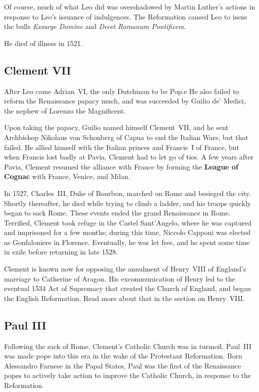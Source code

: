 Of course, much of what Leo did was overshadowed by Martin Luther's actions
in response to Leo's issuance of indulgences.
The Reformation caused Leo to issue the bulls \textit{Exsurge Domine} and \textit{Decet Romanum Pontificem}.

He died of illness in 1521.

\subsection*{Clement VII}

After Leo came Adrian~VI, the only Dutchman to be Pop.e
He also failed to reform the Renaissance papacy much,
and was succeeded by Guilio de' Medici,
the nephew of Lorenzo the Magnificent.

Upon taking the papacy, Guilio named himself Clement~VII,
and he sent Archbishop Nikolaus von Schonberg of Capua to end the Italian Wars, but that failed.
He allied himself with the Italian princes and Francis~I of France,
but when Francis lost badly at Pavia, Clement had to let go of ties.
A few years after Pavia, Clement resumed the alliance with France
by forming the \textbf{League of Cognac} with France, Venice, and Milan.

In 1527, Charles~III, Duke of Bourbon, marched on Rome and besieged the city.
Shortly thereafter, he died while trying to climb a ladder,
and his troops quickly began to sack Rome.
These events ended the grand Renaissance in Rome.
Terrified, Clement took refuge in the Castel Sant'Angelo,
where he was captured and imprisoned for a few months;
during this time, Niccolo Capponi was elected as Gonfaloniere in Florence.
Eventually, he was let free, and he spent some time in exile before returning in late 1528.

Clement is known now for opposing the annulment of Henry~VIII of England's marriage to Catherine of Aragon.
His excommunication of Henry led to the eventual 1534 Act of Supremacy that created the Church of England,
and began the English Reformation.
Read more about that in the section on Henry~VIII.

\subsection*{Paul III}

Following the sack of Rome, Clement's Catholic Church was in turmoil.
Paul~III was made pope into this era in the wake of the Protestant Reformation.
Born Alessandro Farnese in the Papal States,
Paul was the first of the Renaissance popes to actively take action to improve the Catholic Church,
in response to the Reformation.

